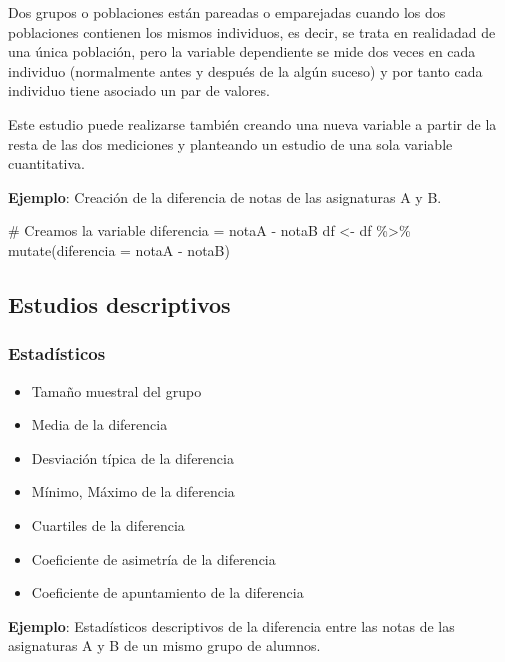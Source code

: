 \documentclass[
  a4paper,
]{scrreport}
\newenvironment{Shaded}{\begin{snugshade}}{\end{snugshade}}
\newcommand{\AttributeTok}[1]{\textcolor[rgb]{0.40,0.45,0.13}{#1}}
\newcommand{\CommentTok}[1]{\textcolor[rgb]{0.37,0.37,0.37}{#1}}
\newcommand{\FunctionTok}[1]{\textcolor[rgb]{0.28,0.35,0.67}{#1}}
\newcommand{\NormalTok}[1]{\textcolor[rgb]{0.00,0.23,0.31}{#1}}
\newcommand{\OtherTok}[1]{\textcolor[rgb]{0.00,0.23,0.31}{#1}}
\newcommand{\SpecialCharTok}[1]{\textcolor[rgb]{0.37,0.37,0.37}{#1}}
\providecommand{\tightlist}{%
  \setlength{\itemsep}{0pt}\setlength{\parskip}{0pt}}\usepackage{longtable,booktabs,array}
\theoremstyle{definition}
\theoremstyle{definition}
\theoremstyle{remark}
\begin{document}
Dos grupos o poblaciones están pareadas o emparejadas cuando los dos
poblaciones contienen los mismos individuos, es decir, se trata en
realidadad de una única población, pero la variable dependiente se mide
dos veces en cada individuo (normalmente antes y después de la algún
suceso) y por tanto cada individuo tiene asociado un par de valores.

Este estudio puede realizarse también creando una nueva variable a
partir de la resta de las dos mediciones y planteando un estudio de una
sola variable cuantitativa.

\textbf{Ejemplo}: Creación de la diferencia de notas de las asignaturas
A y B.

\begin{Shaded}
\begin{Highlighting}[]
\CommentTok{\# Creamos la variable diferencia = notaA {-} notaB}
\NormalTok{df }\OtherTok{\textless{}{-}}\NormalTok{ df }\SpecialCharTok{\%\textgreater{}\%} \FunctionTok{mutate}\NormalTok{(}\AttributeTok{diferencia =}\NormalTok{ notaA }\SpecialCharTok{{-}}\NormalTok{ notaB)}
\end{Highlighting}
\end{Shaded}

\hypertarget{estudios-descriptivos-3}{%
\subsection{Estudios descriptivos}\label{estudios-descriptivos-3}}

\hypertarget{estaduxedsticos-3}{%
\subsubsection{Estadísticos}\label{estaduxedsticos-3}}

\begin{itemize}
\tightlist
\item
  Tamaño muestral del grupo
\item
  Media de la diferencia
\item
  Desviación típica de la diferencia
\item
  Mínimo, Máximo de la diferencia
\item
  Cuartiles de la diferencia
\item
  Coeficiente de asimetría de la diferencia
\item
  Coeficiente de apuntamiento de la diferencia
\end{itemize}

\textbf{Ejemplo}: Estadísticos descriptivos de la diferencia entre las
notas de las asignaturas A y B de un mismo grupo de alumnos.
\end{document}
